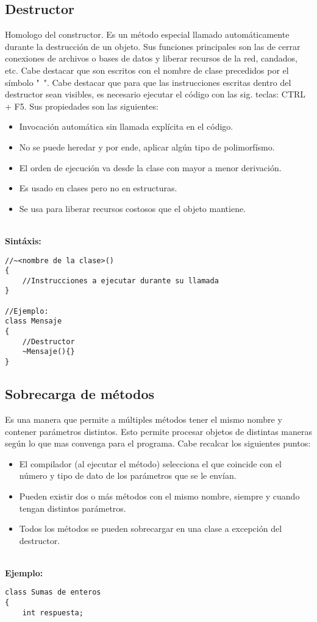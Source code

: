 \documentclass[letterpaper, 12pt]{article}
\begin{document}
\begin{justify}
        \subsection{Destructor}
        Homologo del constructor. Es un método especial llamado automáticamente durante la destrucción de un objeto. Sus funciones principales son las de
        cerrar conexiones de archivos o bases de datos y liberar recursos de la red, candados, etc. Cabe destacar que son escritos con el nombre de clase precedidos
        por el símbolo "~". Cabe destacar que para que las instrucciones escritas dentro del destructor sean visibles, es necesario ejecutar el código con las sig. teclas:
        CTRL + F5. Sus propiedades son las siguientes:
        \begin{itemize}
            \item Invocación automática sin llamada explícita en el código.
            \item No se puede heredar y por ende, aplicar algún tipo de polimorfísmo.
            \item El orden de ejecución va desde la clase con mayor a menor derivación.
            \item Es usado en clases pero no en estructuras.
            \item Se usa para liberar recursos costosos que el objeto mantiene.
        \end{itemize}
        \textbf{\\Sintáxis:}
            \begin{verbatim}
//~<nombre de la clase>()
{
    //Instrucciones a ejecutar durante su llamada
}

//Ejemplo:
class Mensaje
{
    //Destructor
    ~Mensaje(){}
}
            \end{verbatim}
        \subsection{Sobrecarga de métodos}
        Es una manera que permite a múltiples métodos tener el mismo nombre y contener parámetros distintos. Esto permite procesar objetos de
        distintas maneras según lo que mas convenga para el programa.
        Cabe recalcar los siguientes puntos:
        \begin{itemize}
            \item El compilador (al ejecutar el método) selecciona el que coincide con el número y tipo de dato de los parámetros que se le envían.
            \item Pueden existir dos o más métodos con el mismo nombre, siempre y cuando tengan distintos parámetros.
            \item Todos los métodos se pueden sobrecargar en una clase a excepción del destructor.
        \end{itemize}
        \textbf{\\Ejemplo:}
            \begin{verbatim}
class Sumas de enteros
{
    int respuesta;


\end{verbatim}
\end{justify}
\end{document}
